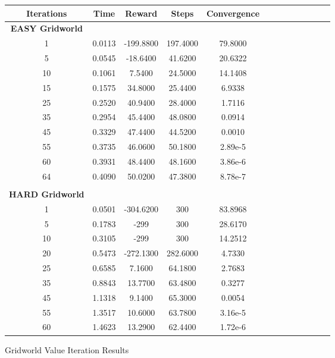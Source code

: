 \documentclass[h]{article}
\begin{document}
 
 \begin{figure}[H] 
\centering
\begin{tabular}{ | c | c  | c | c | c | c | c | c| c| c| c| c| c | } 
\hline
\textbf{Iterations} & \textbf{Time} & \textbf{Reward} & \textbf{Steps} & \textbf{Convergence}   \\
\hline
\textbf{EASY Gridworld} \\ \hline
1 & 0.0113 & -199.8800 & 197.4000 & 79.8000 \\ \hline
5 & 0.0545 & -18.6400 & 41.6200 & 20.6322 \\ \hline
10 & 0.1061 & 7.5400 & 24.5000 & 14.1408 \\ \hline
15 & 0.1575 & 34.8000 & 25.4400 & 6.9338 \\ \hline
25 & 0.2520 & 40.9400 & 28.4000 & 1.7116 \\ \hline
35 & 0.2954 & 45.4400 & 48.0800 & 0.0914 \\ \hline
45 & 0.3329 & 47.4400 & 44.5200 & 0.0010 \\ \hline
55 & 0.3735 & 46.0600 & 50.1800 & 2.89e-5 \\ \hline
60 & 0.3931 & 48.4400 & 48.1600 & 3.86e-6 \\ \hline
64 & 0.4090 & 50.0200 & 47.3800 & 8.78e-7 \\ \hline
\\
\textbf{HARD Gridworld} \\ \hline
1 & 0.0501 & -304.6200 & 300 & 83.8968 \\ \hline
5 & 0.1783 & -299 & 300 & 28.6170 \\ \hline
10 & 0.3105 & -299 & 300 & 14.2512 \\ \hline
20 & 0.5473 & -272.1300 & 282.6000 & 4.7330 \\ \hline
25 & 0.6585 & 7.1600 & 64.1800 & 2.7683 \\ \hline
35 & 0.8843 & 13.7700 & 63.4800 & 0.3277 \\ \hline
45 & 1.1318 & 9.1400 & 65.3000 & 0.0054 \\ \hline
55 & 1.3517 & 10.6000 & 63.7800 & 3.16e-5 \\ \hline
60 & 1.4623 & 13.2900 & 62.4400 & 1.72e-6 \\ \hline

\end{tabular}
\caption*{Gridworld Value Iteration Results} 
\end{figure}
 
\end{document}
